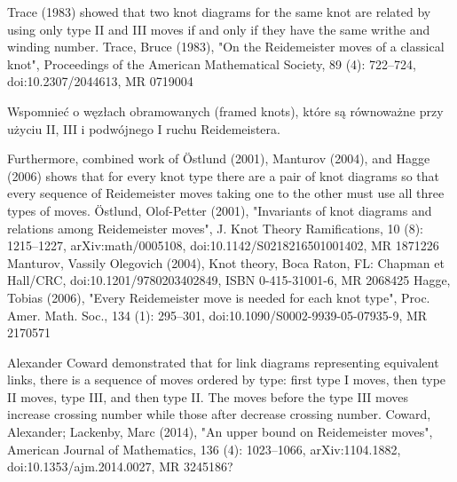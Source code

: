 \begin{tobedone}
    Trace (1983) showed that two knot diagrams for the same knot are related by using only type II and III moves if and only if they have the same writhe and winding number.
    Trace, Bruce (1983), "On the Reidemeister moves of a classical knot", Proceedings of the American Mathematical Society, 89 (4): 722–724, doi:10.2307/2044613, MR 0719004

    Wspomnieć o węzłach obramowanych (framed knots), które są równoważne przy użyciu II, III i podwójnego I ruchu Reidemeistera.
\end{tobedone}

\begin{tobedone}
    Furthermore, combined work of Östlund (2001), Manturov (2004), and Hagge (2006) shows that for every knot type there are a pair of knot diagrams so that every sequence of Reidemeister moves taking one to the other must use all three types of moves.
    Östlund, Olof-Petter (2001), "Invariants of knot diagrams and relations among Reidemeister moves", J. Knot Theory Ramifications, 10 (8): 1215–1227, arXiv:math/0005108, doi:10.1142/S0218216501001402, MR 1871226
    Manturov, Vassily Olegovich (2004), Knot theory, Boca Raton, FL: Chapman et Hall/CRC, doi:10.1201/9780203402849, ISBN 0-415-31001-6, MR 2068425
    Hagge, Tobias (2006), "Every Reidemeister move is needed for each knot type", Proc. Amer. Math. Soc., 134 (1): 295–301, doi:10.1090/S0002-9939-05-07935-9, MR 2170571
\end{tobedone}

\begin{tobedone}
    Alexander Coward demonstrated that for link diagrams representing equivalent links, there is a sequence of moves ordered by type: first type I moves, then type II moves, type III, and then type II. The moves before the type III moves increase crossing number while those after decrease crossing number.
    Coward, Alexander; Lackenby, Marc (2014), "An upper bound on Reidemeister moves", American Journal of Mathematics, 136 (4): 1023–1066, arXiv:1104.1882, doi:10.1353/ajm.2014.0027, MR 3245186?
\end{tobedone}

